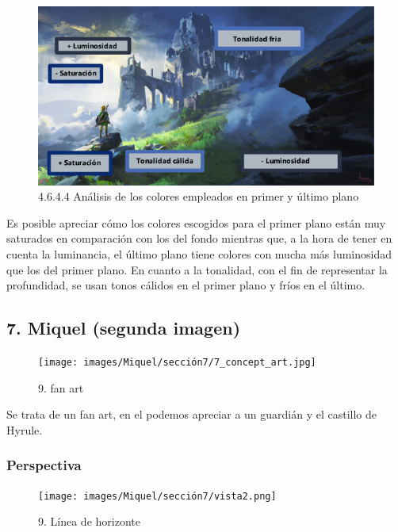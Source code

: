 \documentclass[12pt]{article}
\begin{document}
    \begin{figure}[H]
      \centering
      \includegraphics[scale=0.4]{images/Nerea/Nerea Zelda concept 644.PNG}
      \caption{\small 4.6.4.4 Análisis de los colores empleados en primer y último plano}
    \end{figure}

    Es posible apreciar cómo los colores escogidos para el primer plano están muy saturados en comparación con los del fondo mientras que, a la hora de tener en cuenta la luminancia, el último plano tiene colores con mucha más luminosidad que los del primer plano. En cuanto a la tonalidad, con el fin de representar la profundidad, se usan tonos cálidos en el primer plano y fríos en el último.
        \newpage


    \subsection{7. Miquel (segunda imagen)}
    \begin{figure}[H]
      \centering
      \texttt{[image: images/Miquel/sección7/7\_concept\_art.jpg]}
      \caption{\small 9. fan art}
    \end{figure}

    Se trata de un fan art, en el podemos apreciar a un guardián y el castillo de Hyrule.

        \subsubsection{Perspectiva}

    \begin{figure}[H]
      \centering
      \texttt{[image: images/Miquel/sección7/vista2.png]}
      \caption{\small 9. Línea de horizonte}
    \end{figure}
\end{document}
